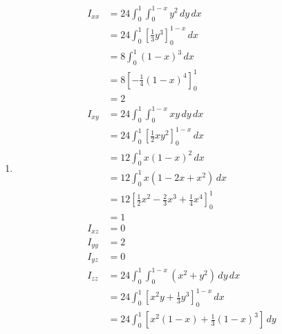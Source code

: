 \documentclass{article}
\begin{document}
\begin{enumerate}
  \item

        \begin{align*}
          I_{x x} & = 24 \int_0^1 \int_0^{1 - x} y^2 \,d y \,d x                                       \\
                  & = 24 \int_0^1 \left[ \frac{1}{3} y^3 \right]_0^{1 - x} \,d x                       \\
                  & = 8 \int_0^1 (1 - x)^3 \,d x                                                       \\
                  & = 8 \left[ -\frac{1}{4} (1 - x)^4 \right]_0^1                                      \\
                  & = 2                                                                                \\
          I_{x y} & = 24 \int_0^1 \int_0^{1 - x} x y \,d y \,d x                                       \\
                  & = 24 \int_0^1 \left[ \frac{1}{2} x y^2 \right]_0^{1 - x} \,d x                     \\
                  & = 12 \int_0^1 x (1 - x)^2 \,d x                                                    \\
                  & = 12 \int_0^1 x (1 - 2 x + x^2) \,d x                                              \\
                  & = 12 \left[ \frac{1}{2} x^2 - \frac{2}{3} x^3 + \frac{1}{4} x^4 \right]_0^1        \\
                  & = 1                                                                                \\
          I_{x z} & = 0                                                                                \\
          I_{y y} & = 2                                                                                \\
          I_{y z} & = 0                                                                                \\
          I_{z z} & = 24 \int_0^1 \int_0^{1 - x} (x^2 + y^2) \,d y \,d x                               \\
                  & = 24 \int_0^1 \left[ x^2 y + \frac{1}{3} y^3 \right]_0^{1 - x} \,d x               \\
                  & = 24 \int_0^1 \left[ x^2 (1 - x) + \frac{1}{3} (1 - x)^3 \right] \,d y             \\

\end{align*}
\end{enumerate}
\end{document}

